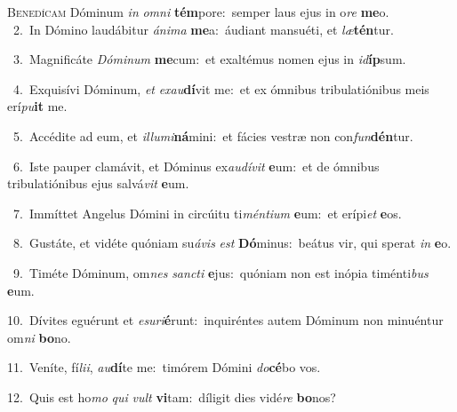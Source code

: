 \lettrine{\initial\textcolor{\initialcolor}{B}}{enedícam} Dóminum \textit{in} \textit{om}\-\textit{ni} \textbf{tém}\-pore:~\star semper laus ejus in o\textit{re} \textbf{me}\-o.\\
{\numbfont\textcolor{\numbcolor}{~2.}}~In Dómino laudábitur \textit{á}\-\textit{ni}\textit{ma} \textbf{me}\-a:~\star áudiant mansuéti, et \textit{læ}\-\textbf{tén}tur.\par
{\numbfont\textcolor{\numbcolor}{~3.}}~Magnificáte \textit{Dó}\-\textit{mi}\textit{num} \textbf{me}\-cum:~\star et exaltémus nomen ejus in \textit{id}\-\textbf{íp}sum.\par
{\numbfont\textcolor{\numbcolor}{~4.}}~Exquisívi Dóminum, \textit{et} \textit{ex}\-\textit{au}\textbf{dí}vit me:~\star et ex ómnibus tribulatiónibus meis erí\-\textit{pu}\-\textbf{it} me.\par
{\numbfont\textcolor{\numbcolor}{~5.}}~Accédite ad eum, et \textit{il}\-\textit{lu}\textit{mi}\textbf{ná}mini:~\star et fácies vestræ non con\-\textit{fun}\-\textbf{dén}tur.\par
{\numbfont\textcolor{\numbcolor}{~6.}}~Iste pauper clamávit, et Dóminus ex\-\textit{au}\-\textit{dí}\textit{vit} \textbf{e}\-um:~\star et de ómnibus tribulatiónibus ejus salvá\textit{vit} \textbf{e}\-um.\par
{\numbfont\textcolor{\numbcolor}{~7.}}~Immíttet Angelus Dómini in circúitu ti\-\textit{mén}\-\textit{ti}\textit{um} \textbf{e}\-um:~\star et erípi\textit{et} \textbf{e}\-os.\par
{\numbfont\textcolor{\numbcolor}{~8.}}~Gustáte, et vidéte quóniam su\-\textit{á}\-\textit{vis} \textit{est} \textbf{Dó}\-minus:~\star beátus vir, qui sperat \textit{in} \textbf{e}\-o.\par
{\numbfont\textcolor{\numbcolor}{~9.}}~Timéte Dóminum, om\textit{nes} \textit{sanc}\-\textit{ti} \textbf{e}\-jus:~\star quóniam non est inópia timénti\textit{bus} \textbf{e}\-um.\par
{\numbfont\textcolor{\numbcolor}{10.}}~Dívites eguérunt et \textit{e}\-\textit{su}\textit{ri}\textbf{é}runt:~\star inquiréntes autem Dóminum non minuéntur om\textit{ni} \textbf{bo}\-no.\par
{\numbfont\textcolor{\numbcolor}{11.}}~Veníte, fí\-\textit{li}\-\textit{i}, \textit{au}\-\textbf{dí}te me:~\star timórem Dómini \textit{do}\-\textbf{cé}bo vos.\par
{\numbfont\textcolor{\numbcolor}{12.}}~Quis est ho\textit{mo} \textit{qui} \textit{vult} \textbf{vi}\-tam:~\star díligit dies vidé\textit{re} \textbf{bo}\-nos?\par
